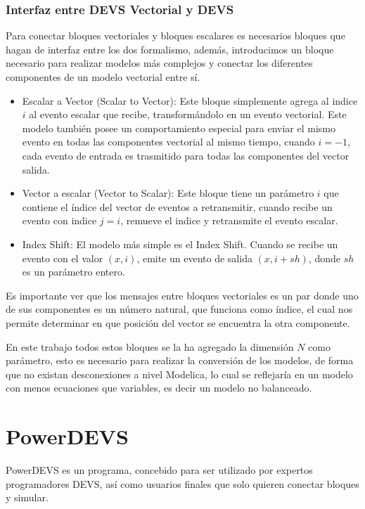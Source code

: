 	\subsubsection{Interfaz entre DEVS Vectorial y DEVS}
	Para conectar bloques vectoriales y bloques escalares es necesarios bloques que hagan de interfaz entre los dos formalismo, además, introducimos 
	un bloque necesario para realizar modelos más complejos y conectar los diferentes componentes de un modelo vectorial entre sí.

	\begin{itemize}
		\item Escalar a Vector (Scalar to Vector): Este bloque simplemente agrega al indice $i$ al evento escalar que recibe, transformándolo en un 
			evento vectorial. Este modelo también posee un comportamiento especial para enviar el mismo evento en todas las componentes vectorial 
			al mismo tiempo, cuando $i = -1$, cada evento de entrada es trasmitido para todas las componentes del vector salida.
		\item Vector a escalar (Vector to Scalar): Este bloque tiene un parámetro $i$ que contiene el índice del vector de eventos a retransmitir, 
			cuando recibe un evento con indice $j=i$, remueve el indice y retransmite el evento escalar.
		\item Index Shift: El modelo más simple es el Index Shift. Cuando se recibe un evento con el valor $(x,i)$, emite un evento de salida $(x, i+sh)$, 
			donde $sh$ es un parámetro entero.
	\end{itemize}

	Es importante ver que los mensajes entre bloques vectoriales es un par donde uno de sus componentes es un número natural, que funciona como índice,
	el cual nos permite determinar en que posición del vector se encuentra la otra componente.

	En este trabajo todos estos bloques se la ha agregado la dimensión $N$ como parámetro, esto es necesario para realizar la conversión de los modelos,
	 de forma que no existan desconexiones a nivel Modelica, lo cual se reflejaría en un modelo con menos ecuaciones que variables, es decir un modelo 
	no balanceado.
	 
\section{PowerDEVS}
	PowerDEVS\cite{BK11}  es un programa, concebido para ser utilizado por expertos programadores DEVS, así como usuarios finales que solo quieren 
	conectar bloques y simular.


